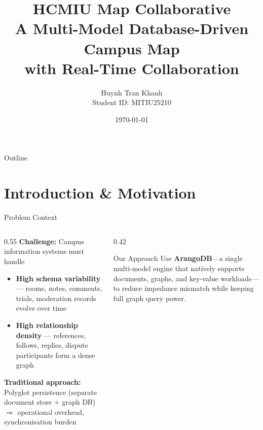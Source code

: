 \documentclass[aspectratio=169,11pt]{beamer}
\title[HCMIU Map Collaborative]{%
  HCMIU Map Collaborative\\[4pt]
  \small A Multi-Model Database-Driven Campus Map\\
  with Real-Time Collaboration}
\author{Huynh Tran Khanh \\ \small Student ID: MITIU25210}
\institute{%
  Advanced Database System (IT502IU)\\
  International University --- VNU-HCM}
\date{\today}
\begin{document}
\begin{frame}
  \titlepage
\end{frame}

\begin{frame}{Outline}
  \tableofcontents
\end{frame}

\section{Introduction \& Motivation}

\begin{frame}{Problem Context}
  \begin{columns}[T]
    \begin{column}{0.55\textwidth}
      \textbf{Challenge:} Campus information systems must handle
      \begin{itemize}
        \item \textbf{High schema variability} --- rooms, notes, comments,
              trials, moderation records evolve over time
        \item \textbf{High relationship density} --- references, follows,
              replies, dispute participants form a dense graph
      \end{itemize}
      \vspace{0.5em}
      \textbf{Traditional approach:}
      Polyglot persistence (separate document store + graph DB)
      $\Rightarrow$ operational overhead, synchronisation burden
      \cite{stonebraker2005onesize, sadalage2012nosql}
    \end{column}
    \begin{column}{0.42\textwidth}
      \begin{block}{Our Approach}
        Use \textbf{ArangoDB}---a single multi-model engine that
        natively supports documents, graphs, and key-value
        workloads---to reduce impedance mismatch while keeping
        full graph query power.
      \end{block}
    \end{column}
  \end{columns}
\end{frame}
\end{document}
